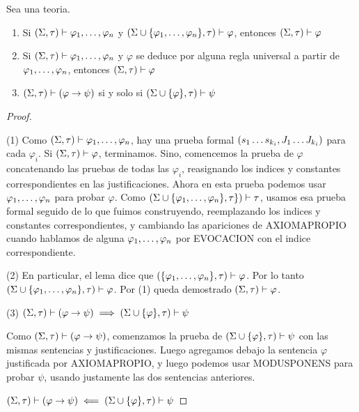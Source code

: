 \begin{lemma}
  Sea \forder una teoria. \begin{enumerate}
    \item Si $\forder\proves\succession{\varphi}{1}{n}$ y $(\Sigma\cup\{\succession{\varphi}{1}{n}\},\tau)\proves\varphi$, entonces $\forder\proves\varphi$
    \item Si $\forder\proves\succession{\varphi}{1}{n}$ y $\varphi$ se deduce por alguna regla universal a partir de $\succession{\varphi}{1}{n}$, entonces $\forder\proves\varphi$
    \item $\forder\proves(\varphi\rightarrow\psi)$ si y solo si $(\Sigma\cup\{\varphi\},\tau)\proves\psi$
  \end{enumerate}
\end{lemma}
\begin{proof}
  $ $

  (1) Como $\forder\proves\succession{\varphi}{1}{n}$, hay una prueba formal $(\succession[]{s}{1}{k_i},\succession[]{J}{1}{k_i})$ para cada $\varphi_i$.
  Si $\forder\proves\varphi$, terminamos. Sino, comencemos la prueba de $\varphi$ concatenando las pruebas de todas las $\varphi_i$, reasignando los indices y constantes correspondientes 
  en las justificaciones. Ahora en esta prueba podemos usar $\succession{\varphi}{1}{n}$ para probar $\varphi$. Como $(\Sigma\cup\{\succession{\varphi}{1}{n}\},\tau\})\proves\tau$, usamos 
  esa prueba formal seguido de lo que fuimos construyendo, reemplazando los indices y constantes correspondientes, y cambiando las apariciones de AXIOMAPROPIO cuando hablamos de alguna $\succession{\varphi}{1}{n}$
  por EVOCACION con el indice correspondiente.
  
  (2) En particular, el lema dice que $(\{\succession{\varphi}{1}{n}\},\tau)\proves\varphi$. Por lo tanto $(\Sigma\cup\{\succession{\varphi}{1}{n}\},\tau)\proves\varphi$. Por (1) queda demostrado
  $\forder\proves\varphi$.

  (3) 
    $\forder\proves(\varphi\rightarrow\psi) \implies (\Sigma\cup\{\varphi\},\tau)\proves\psi$

    Como $\forder\proves(\varphi\rightarrow\psi)$, comenzamos la prueba de $(\Sigma\cup\{\varphi\},\tau)\proves\psi$
    con las mismas sentencias y justificaciones. Luego agregamos debajo la sentencia $\varphi$ justificada por AXIOMAPROPIO, y luego podemos usar 
    MODUSPONENS para probar $\psi$, usando justamente las dos sentencias anteriores.

    $\forder\proves(\varphi\rightarrow\psi) \impliedby (\Sigma\cup\{\varphi\},\tau)\proves\psi$    


\end{proof}
